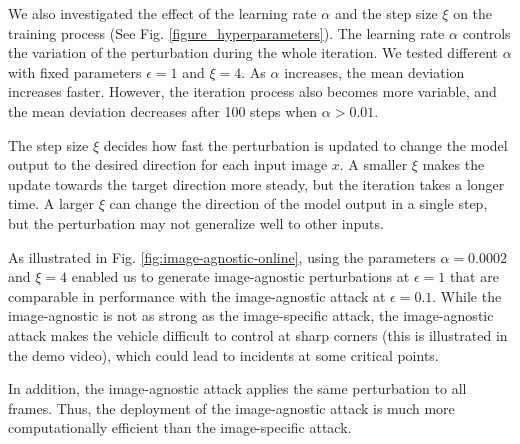 We also investigated the effect of the learning rate $\alpha$ and the step size $\xi$ on the training process (See Fig. \ref{figure_hyperparameters}). The learning rate $\alpha$ controls the variation of the perturbation during the whole iteration. We tested different $\alpha$ with fixed parameters $\epsilon=1$ and $\xi=4$. As $\alpha$ increases, the mean deviation increases faster. However, the iteration process also becomes more variable, and the mean deviation decreases after 100 steps when $\alpha>0.01$. 

The step size $\xi$ decides how fast the perturbation is updated to change the model output to the desired direction for each input image $x$. A smaller $\xi$ makes the update towards the target direction more steady, but the iteration takes a longer time. A larger $\xi$ can change the direction of the model output in a single step, but the perturbation may not generalize well to other inputs.

As illustrated in Fig. \ref{fig:image-agnostic-online}, using the parameters $\alpha=0.0002$ and $\xi=4$ enabled us to generate image-agnostic perturbations at $\epsilon=1$ that are comparable in performance with the image-agnostic attack at $\epsilon=0.1$. While the image-agnostic is not as strong as the image-specific attack, the image-agnostic attack makes the vehicle difficult to control at sharp corners (this is illustrated in the demo video), which could lead to incidents at some critical points. 

In addition, the image-agnostic attack applies the same perturbation to all frames. Thus, the deployment of the image-agnostic attack is much more computationally efficient than the image-specific attack.


